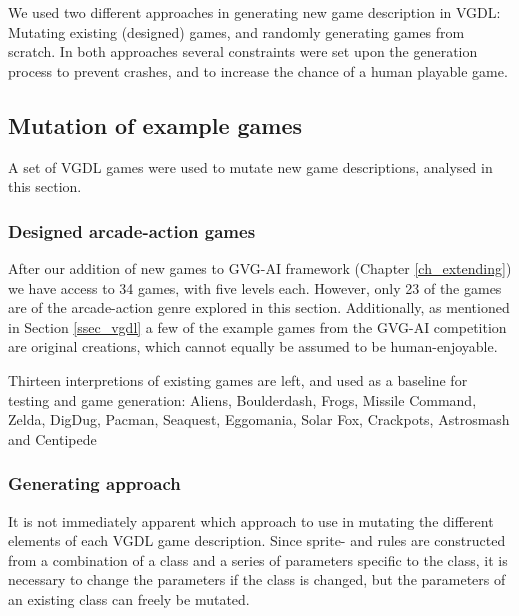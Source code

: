 \documentclass[a4paper,titlepage,final]{report}
\begin{document}
We used two different approaches in generating new game description in VGDL: Mutating existing (designed) games, and randomly generating games from scratch.
In both approaches several constraints were set upon the generation process to prevent crashes, and to increase the chance of a human playable game.


\subsection{Mutation of example games}
\label{method:mutation}
A set of VGDL games were used to mutate new game descriptions, analysed in this section.

\subsubsection*{Designed arcade-action games}
After our addition of new games to GVG-AI framework (Chapter \ref{ch_extending}) we have access to 34 games, with five levels each. 
However, only 23 of the games are of the arcade-action genre explored in this section. Additionally, as mentioned in Section \ref{ssec_vgdl} a few of the example games from the GVG-AI competition are original creations, which cannot equally be assumed to be human-enjoyable.

Thirteen interpretions of existing games are left, and used as a baseline for testing and game generation: Aliens, Boulderdash, Frogs, Missile Command, Zelda, DigDug, Pacman, Seaquest, Eggomania, Solar Fox, Crackpots, Astrosmash and Centipede





\subsubsection*{Generating approach}
It is not immediately apparent which approach to use in mutating the different elements of  each VGDL game description.
Since sprite- and rules are constructed from a combination of a class and a series of parameters specific to the class, it is necessary to change the parameters if the class is changed, but the parameters of an existing class can freely be mutated.
\end{document}
